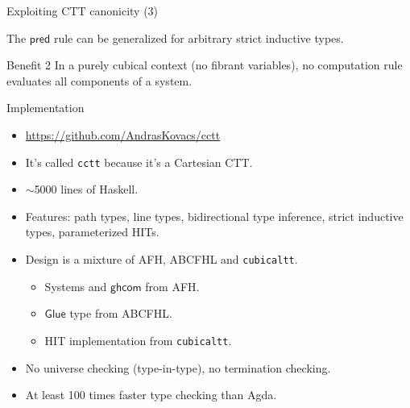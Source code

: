 \documentclass[dvipsnames]{beamer}
\newcommand{\ms}[1]{\mathsf{#1}}
\newcommand{\Glue}{\ms{Glue}}
\newcommand{\ghcom}{\ms{ghcom}}
\begin{document}
\begin{frame}{Exploiting CTT canonicity (3)}

The $\ms{pred}$ rule can be generalized for arbitrary strict inductive types.
\vspace{1em}
\pause

\begin{block}{Benefit 2}
In a purely cubical context (no fibrant variables), no computation rule evaluates
all components of a system.
\end{block}

\end{frame}



\begin{frame}{Implementation}

\begin{itemize}
\item \url{https://github.com/AndrasKovacs/cctt}
\item It's called \texttt{cctt} because it's a Cartesian CTT.
\item $\sim$5000 lines of Haskell.
\item Features: path types, line types, bidirectional type inference, strict
      inductive types, parameterized HITs.
\item Design is a mixture of AFH, ABCFHL and \texttt{cubicaltt}.
  \begin{itemize}
    \item Systems and $\ghcom$ from AFH.
    \item $\Glue$ type from ABCFHL.
    \item HIT implementation from \texttt{cubicaltt}.
  \end{itemize}
\item No universe checking (type-in-type), no termination checking.
\item At least 100 times faster type checking than Agda.
\end{itemize}

\end{frame}
\end{document}
